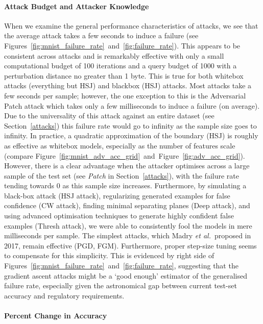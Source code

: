 \documentclass[journal]{IEEEtran}
\begin{document}
\paragraph{Attack Budget and Attacker Knowledge}
When we examine the general performance characteristics of attacks, we see that the average attack takes a few seconds to induce a failure (see Figures~\ref{fig:mnist_failure_rate}~and~\ref{fig:failure_rate}).
This appears to be consistent across attacks and is remarkably effective with only a small computational budget of 100 iterations and a query budget of 1000 with a perturbation distance no greater than 1 byte.
This is true for both whitebox attacks  (everything but HSJ) and blackbox (HSJ) attacks.
Most attacks take a few seconds per sample; however, the one exception to this is the Adversarial Patch attack which takes only a few milliseconds to induce a failure (on average).
Due to the universality of this attack against an entire dataset (see Section~\ref{attacks}) this failure rate would go to infinity as the sample size goes to infinity.
In practice, a quadratic approximation of the boundary (HSJ) is roughly as effective as whitebox models, especially as the number of features scale (compare Figure~\ref{fig:mnist_adv_acc_grid}~and~Figure~\ref{fig:adv_acc_grid}).
However, there is a clear advantage when the attacker optimises across a large sample of the test set (see \textit{Patch} in Section~\ref{attacks}), with the failure rate tending towards 0 as this sample size increases.
Furthermore, by simulating a black-box attack (HSJ attack), regularizing generated examples for false confidence (CW attack), finding minimal separating planes (Deep attack),  and using advanced optimisation techniques to generate highly confident false examples (Thresh attack), we were able to consistently fool the models in mere milliseconds per sample.
The simplest attacks, which Madry \textit{et al.}~proposed in 2017, remain effective (PGD, FGM).
Furthermore, proper step-size tuning seems to compensate for this simplicity.
This is evidenced by right side of Figures~\ref{fig:mnist_failure_rate}~and~\ref{fig:failure_rate}, suggesting that the gradient ascent attacks might be a `good enough' estimator of the generalised failure rate, especially given the astronomical gap between current test-set accuracy and regulatory requirements.


\paragraph{Percent Change in Accuracy}
\end{document}
